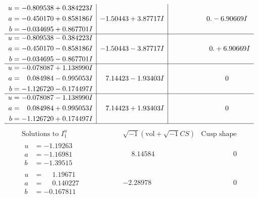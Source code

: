 \documentclass[1p]{elsarticle_modified}
\theoremstyle{definition}
\newcommand{\I}{\sqrt{-1}}
\begin{document}
$$\begin{array}{c|c|c}
\begin{aligned}
u &= -0.809538 + 0.384223 I \\
a &= -0.450170 + 0.858186 I \\
b &= -0.034695 + 0.867701 I\end{aligned}
 & -1.50443 + 3.87717 I & \phantom{-0.000000 } 0. - 6.90669 I \\ \hline\begin{aligned}
u &= -0.809538 - 0.384223 I \\
a &= -0.450170 - 0.858186 I \\
b &= -0.034695 - 0.867701 I\end{aligned}
 & -1.50443 - 3.87717 I & \phantom{-0.000000 -}0. + 6.90669 I \\ \hline\begin{aligned}
u &= -0.078087 + 1.138990 I \\
a &= \phantom{-}0.084984 - 0.995053 I \\
b &= -1.126720 - 0.174497 I\end{aligned}
 & \phantom{-}7.14423 - 1.93403 I & \phantom{-0.000000 } 0 \\ \hline\begin{aligned}
u &= -0.078087 - 1.138990 I \\
a &= \phantom{-}0.084984 + 0.995053 I \\
b &= -1.126720 + 0.174497 I\end{aligned}
 & \phantom{-}7.14423 + 1.93403 I & \phantom{-0.000000 } 0\\
 \hline 
 \end{array}$$\newpage$$\begin{array}{c|c|c}  
\text{Solutions to }I^u_{1}& \I (\text{vol} + \sqrt{-1}CS) & \text{Cusp shape}\\
 \hline 
\begin{aligned}
u &= -1.19263\phantom{ +0.000000I} \\
a &= -1.16981\phantom{ +0.000000I} \\
b &= -1.39515\phantom{ +0.000000I}\end{aligned}
 & \phantom{-}8.14584\phantom{ +0.000000I} & \phantom{-0.000000 } 0 \\ \hline\begin{aligned}
u &= \phantom{-}1.19671\phantom{ +0.000000I} \\
a &= \phantom{-}0.140227\phantom{ +0.000000I} \\
b &= -0.167811\phantom{ +0.000000I}\end{aligned}
 & -2.28978\phantom{ +0.000000I} & \phantom{-0.000000 } 0 \\ \hline\begin{aligned}

\end{aligned}
\end{array}$$
\end{document}

